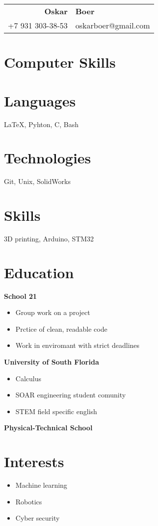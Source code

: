 \documentclass{article}
\begin{document}
\begin{tabular}{rl}

\huge\textbf{Oskar} &\huge\textbf{Boer}\\
+7 931 303-38-53 &oskarboer@gmail.com\end{tabular}
\section{Computer Skills}
\section{Languages}
\LaTeX, Pyhton, C, Bash
\section{Technologies}
Git, Unix, SolidWorks
\section{Skills}
3D printing, Arduino, STM32
\section{\textcolor{myBrown}{Education}}
\textbf{School 21}
\begin{itemize}
\item Group work on a project
\item Prctice of clean, readable code
\item Work in enviromant with strict deadlines
\end{itemize}
\textbf{University of South Florida}
\begin{itemize}
\item Calculus
\item SOAR engineering student comunity
\item STEM field specific english
\end{itemize}
\textbf{Physical-Technical School}
\section{Interests} 
\begin{itemize}
\item Machine learning
\item Robotics
\item Cyber security
\end{itemize}
\end{document}
